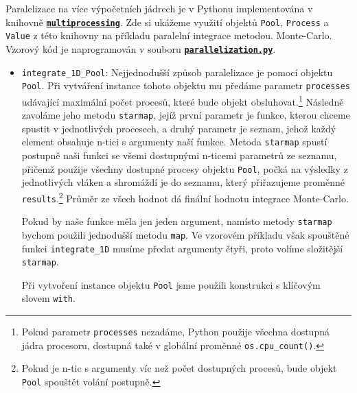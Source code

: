 \documentclass[a4paper,11pt,twoside]{article}
\def\code#1{\textnormal{\texttt{#1}}}
\def\file#1{\textnormal{\textbf{\texttt{#1}}}}
\def\ghfile#1#2{\textnormal{\textbf{\texttt{\href{https://github.com/PavelStransky/PCInPhysics2021/blob/main/#1#2}{#2}}}}}
\theoremstyle{red}
\theoremstyle{green}
\begin{document}
    Paralelizace na více výpočetních jádrech je v Pythonu implementována v knihovně \file{\href{https://docs.python.org/3/library/multiprocessing.html}{mul\-ti\-pro\-ces\-sing}}.
    Zde si ukážeme využití objektů \code{Pool}, \code{Process} a \code{Value} z této knihovny na příkladu paralelní integrace metodou. Monte-Carlo.
    Vzorový kód je naprogramován v souboru \ghfile{python/montecarlo/}{parallelization.py}.
    \begin{itemize}
        \item \code{integrate_1D_Pool}:
            Nejjednodušší způsob paralelizace je pomocí objektu \code{Pool}. 
            Při vytváření instance tohoto objektu mu předáme parametr \code{processes} udávající maximální počet procesů, které bude objekt obsluhovat.\footnote{
                Pokud parametr \code{processes} nezadáme, Python použije všechna dostupná jádra procesoru, dostupná také v globální proměnné \code{os.cpu\_count()}.
            }
            Následně zavoláme jeho metodu \code{starmap}, jejíž první parametr je funkce, kterou chceme spustit v jednotlivých procesech, a druhý parametr je seznam, jehož každý element obsahuje n-tici s argumenty naší funkce.
            Metoda \code{starmap} spustí postupně naši funkci se všemi dostupnými n-ticemi parametrů ze seznamu, přičemž použije všechny dostupné procesy objektu \code{Pool},
            počká na výsledky z jednotlivých vláken a shromáždí je do seznamu, který přiřazujeme proměnné \code{results}.\footnote{
                Pokud je n-tic s argumenty víc než počet dostupných procesů, bude objekt \code{Pool} spouštět volání postupně.
            }
            Průměr ze všech hodnot dá finální hodnotu integrace Monte-Carlo.

            Pokud by naše funkce měla jen jeden argument, namísto metody \code{starmap} bychom použili jednodušší metodu \code{map}.
            Ve vzorovém příkladu však spouštěné funkci \code{integrate_1D} musíme předat argumenty čtyři, proto volíme složitější \code{starmap}.

            Při vytvoření instance objektu \code{Pool} jsme použili konstrukci s klíčovým slovem \code{with}.


\end{itemize}
\end{document}
